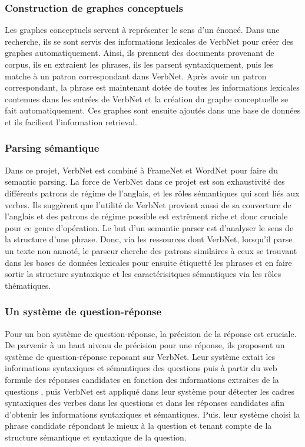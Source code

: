 \subsubsection{Construction de graphes conceptuels}
\citep{HensmanAutomaticallyBuildingConceptual2004}
Les graphes conceptuels servent à représenter le sens d'un énoncé. Dans une recherche, ils se sont servis des informations lexicales de VerbNet pour créer des graphes automatiquement. Ainsi, ils prennent des documents provenant de corpus, ils en extraient les phrases, ils les parsent syntaxiquement, puis les matche à un patron correspondant dans VerbNet. Après avoir un patron correspondant, la phrase est maintenant dotée de toutes les informations lexicales contenues dans les entrées de VerbNet et la création du graphe conceptuelle se fait automatiquement. Ces graphes sont ensuite ajoutés dans une base de données et ils facilient l'information retrieval.

\subsubsection{Parsing sémantique}
\citep{Shi:2005:PPT:2132047.2132058}
Dans ce projet, VerbNet est combiné à FrameNet et WordNet pour faire du semantic parsing. La force de VerbNet dans ce projet est son exhaustivité des différents patrons de régime de l'anglais, et les rôles sémantiques qui sont liés aux verbes. Ils suggèrent que l'utilité de VerbNet provient aussi de sa couverture de l'anglais et des patrons de régime possible est extrêment riche et donc cruciale pour ce genre d'opération. Le but d'un semantic parser est d'analyser le sens de la structure d'une phrase. Donc, via les ressources dont VerbNet, lorsqu'il parse un texte non annoté, le parseur cherche des patrons similaires à ceux se trouvant dans les bases de données lexicales pour ensuite étiquetté les phrases et en faire sortir la structure syntaxique et les caractérisitques sémantiques via les rôles thématiques.

\subsubsection{Un système de question-réponse}
\citep{DBLP:conf/nlpke/WenJH08}
Pour un bon système de question-réponse, la précision de la réponse est cruciale. De parvenir à un haut niveau de précision pour une réponse, ils proposent un système de question-réponse reposant sur VerbNet. Leur système extait les informations syntaxiques et sémantiques des questions puis à partir du web formule des réponses candidates en fonction des informations extraites de la questions , puis VerbNet est appliqué dans leur système pour détecter les cadres syntaxiques des verbes dans les questions et dans les réponses candidates afin d'obtenir les informations syntaxiques et sémantiques. Puis, leur système choisi la phrase candidate répondant le mieux à la question et tenant compte de la structure sémantique et syntaxique de la question.

